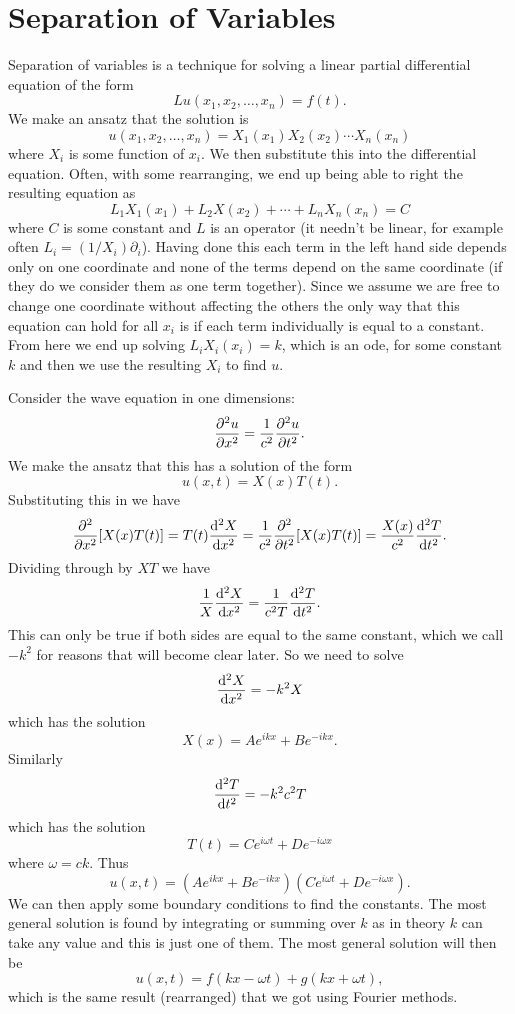 \documentclass[a4paper]{article}
\begin{document}
    \section{Separation of Variables}
    Separation of variables is a technique for solving a linear  partial differential equation of the form
    \[Lu(x_1, x_2, \dotsc, x_n) = f(t).\]
    We make an ansatz that the solution is
    \[u(x_1, x_2, \dotsc, x_n) = X_1(x_1)X_2(x_2)\dotsm X_n(x_n)\]
    where \(X_i\) is some function of \(x_i\).
    We then substitute this into the differential equation.
    Often, with some rearranging, we end up being able to right the resulting equation as
    \[L_1X_1(x_1) + L_2X(x_2) + \dotsb + L_nX_n(x_n) = C\]
    where \(C\) is some constant and \(L\) is an operator (it needn't be linear, for example often \(L_i = (1/X_i)\partial_i\)).
    Having done this each term in the left hand side depends only on one coordinate and none of the terms depend on the same coordinate (if they do we consider them as one term together).
    Since we assume we are free to change one coordinate without affecting the others the only way that this equation can hold for all \(x_i\) is if each term individually is equal to a constant.
    From here we end up solving \(L_iX_i(x_i) = k\), which is an \gls{ode}, for some constant \(k\) and then we use the resulting \(X_i\) to find \(u\).
    
    Consider the wave equation in one dimensions:
    \[\pdv[2]{u}{x} = \frac{1}{c^2}\pdv[2]{u}{t}.\]
    We make the ansatz that this has a solution of the form
    \[u(x, t) = X(x)T(t).\]
    Substituting this in we have
    \[\pdv[2]{x}[X(x)T(t)] = T(t)\dv[2]{X}{x} = \frac{1}{c^2}\pdv[2]{t}[X(x)T(t)] = \frac{X(x)}{c^2}\dv[2]{T}{t}.\]
    Dividing through by \(XT\) we have
    \[\frac{1}{X}\dv[2]{X}{x} = \frac{1}{c^2T}\dv[2]{T}{t}.\]
    This can only be true if both sides are equal to the same constant, which we call \(-k^2\) for reasons that will become clear later.
    So we need to solve
    \[\dv[2]{X}{x} = -k^2X\]
    which has the solution
    \[X(x) = Ae^{ikx} + Be^{-ikx}.\]
    Similarly
    \[\dv[2]{T}{t} = -k^2c^2T\]
    which has the solution
    \[T(t) = Ce^{i\omega t} + De^{-i\omega x}\]
    where \(\omega = ck\).
    Thus
    \[u(x, t) = (Ae^{ikx} + Be^{-ikx})(Ce^{i\omega t} + De^{-i\omega x}).\]
    We can then apply some boundary conditions to find the constants.
    The most general solution is found by integrating or summing over \(k\) as in theory \(k\) can take any value and this is just one of them.
    The most general solution will then be
    \[u(x, t) = f(kx - \omega t) + g(kx + \omega t),\]
    which is the same result (rearranged) that we got using Fourier methods.
    
\end{document}
